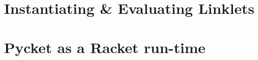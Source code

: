 \documentclass[a4paper]{article}
\begin{document}
\section{Instantiating \& Evaluating Linklets}

\paragraph{} 

\section{Pycket as a Racket run-time}
\end{document}
